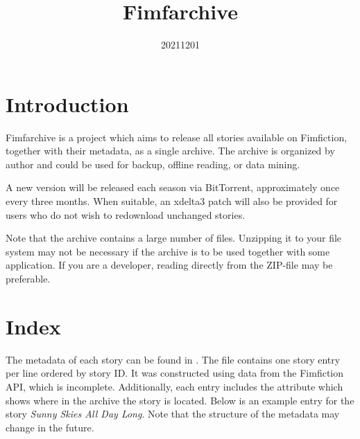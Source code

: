 \documentclass[hidelinks,a4paper,12pt]{article}
\begin{document}
\title{Fimfarchive}
\date{20211201}

\maketitle
\newpage
\tableofcontents
\newpage

\section{Introduction} \label{sec:introduction}

Fimfarchive is a project which aims to release all stories available on Fimfiction, together with their metadata, as a single archive. The archive is organized by author and could be used for backup, offline reading, or data mining.

A new version will be released each season via BitTorrent, approximately once every three months. When suitable, an xdelta3 patch will also be provided for users who do not wish to redownload unchanged stories.

Note that the archive contains a large number of files. Unzipping it to your file system may not be necessary if the archive is to be used together with some application. If you are a developer, reading directly from the ZIP-file may be preferable.


\section{Index} \label{sec:index}

The metadata of each story can be found in . The file contains one story entry per line ordered by story ID. It was constructed using data from the Fimfiction API, which is incomplete. Additionally, each entry includes the attribute  which shows where in the archive the story is located. Below is an example entry for the story \emph{Sunny Skies All Day Long}. Note that the structure of the metadata may change in the future.
\end{document}

